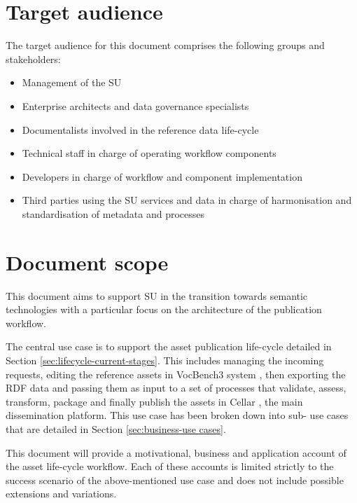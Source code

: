 	
	\section{Target audience}
	\label{sec:audience}
	The target audience for this document comprises the following groups and stakeholders:	

	\begin{itemize}
		\item Management of the SU
		\item Enterprise architects and data governance specialists
		\item Documentalists involved in the reference data life-cycle
		\item Technical staff in charge of operating workflow components
		\item Developers in charge of workflow and component implementation
		\item Third parties using the SU services and data in charge of harmonisation and standardisation of metadata and processes
	\end{itemize}	
	
	\section{Document scope}
	\label{sec:scope}
	
	This document aims to support SU in the transition towards semantic technologies with a particular focus on the architecture of the publication workflow. 
	
	The central use case is to support the asset publication life-cycle detailed in Section \ref{sec:lifecycle-current-stages}. This includes managing the incoming requests, editing the reference assets in VocBench3 system \citep{stellato2017towards,stellatovocbench}, then exporting the RDF data and passing them as input to a set of processes that validate, assess, transform, package and finally publish the assets in Cellar \cite{cdm-francesconi2015ontology}, the main dissemination platform. This use case has been broken down into sub- use cases that are detailed in Section \ref{sec:business-use cases}.
	
	This document will provide a motivational, business and application account of the asset life-cycle workflow. Each of these accounts is limited strictly to the success scenario of the above-mentioned use case and does not include possible extensions and variations.
	
